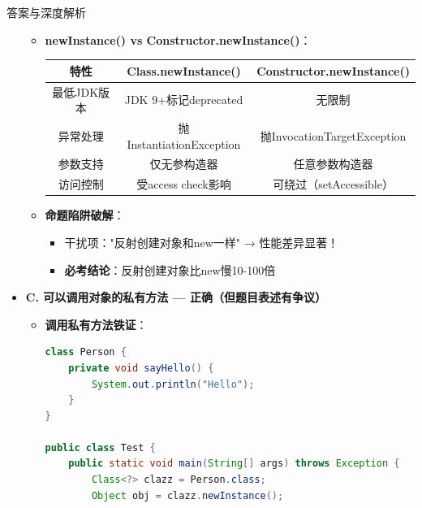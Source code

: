 \documentclass[12pt, a4paper]{ctexart}
\begin{document}
\begin{bluebox}{答案与深度解析}
\begin{itemize}[label={}, leftmargin=*, nosep]
\begin{itemize}[label={}, leftmargin=*, nosep]
			      \item \textbf{newInstance() vs Constructor.newInstance()}：
			            \begin{center}
				            \begin{tabular}{|c|c|c|}
					            \hline
					            \textbf{特性} & \textbf{Class.newInstance()} & \textbf{Constructor.newInstance()} \\
					            \hline
					            最低JDK版本     & JDK 9+标记deprecated           & 无限制                                \\
					            \hline
					            异常处理        & 抛InstantiationException      & 抛InvocationTargetException         \\
					            \hline
					            参数支持        & 仅无参构造器                       & 任意参数构造器                            \\
					            \hline
					            访问控制        & 受access check影响              & 可绕过（setAccessible）                 \\
					            \hline
				            \end{tabular}
			            \end{center}

			      \item \textbf{命题陷阱破解}：
			            \begin{itemize}[label={}, nosep]
				            \item 干扰项："反射创建对象和new一样" → 性能差异显著！
				            \item \textbf{必考结论}：反射创建对象比new慢10-100倍
			            \end{itemize}
		      \end{itemize}

		\item \textbf{C. 可以调用对象的私有方法 — 正确（但题目表述有争议）}
		      \begin{itemize}[label={}, leftmargin=*, nosep]
			      \item \textbf{调用私有方法铁证}：
			            \begin{lstlisting}[language=Java]
class Person {
    private void sayHello() {
        System.out.println("Hello");
    }
}

public class Test {
    public static void main(String[] args) throws Exception {
        Class<?> clazz = Person.class;
        Object obj = clazz.newInstance();
        

\end{lstlisting}
\end{itemize}
\end{itemize}
\end{bluebox}
\end{document}
